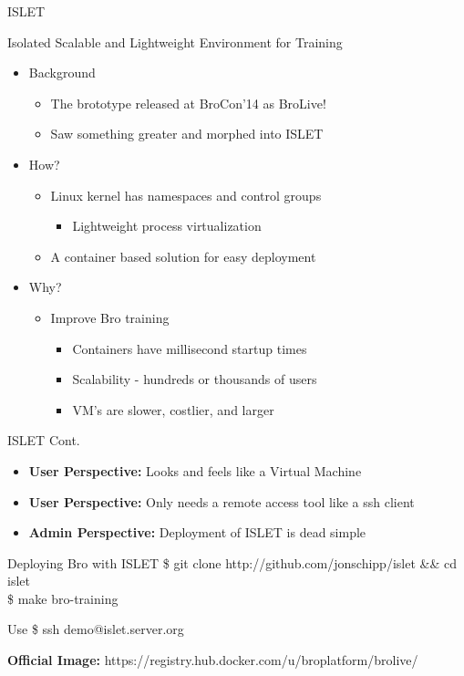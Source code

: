 \documentclass[xcolor=svgnames,handout]{beamer}
\begin{document}
\begin{frame}{ISLET}
  \begin{block}{Isolated Scalable and Lightweight Environment for Training}
    \begin{itemize}
      \item Background
    	\begin{itemize}
		\item The brototype released at BroCon'14 as BroLive!
                \item Saw something greater and morphed into ISLET
    	\end{itemize}
      \item How?
    	\begin{itemize}
		\item Linux kernel has namespaces and control groups
    	        \begin{itemize}
		  \item Lightweight process virtualization
    	        \end{itemize}
		\item A container based solution for easy deployment
    	\end{itemize}
      \item Why?
    	\begin{itemize}
		\item Improve Bro training
    	        \begin{itemize}
		  \item Containers have millisecond startup times
		  \item Scalability - hundreds or thousands of users
		  \item VM's are slower, costlier, and larger
    	        \end{itemize}
    	\end{itemize}
    \end{itemize}
  \end{block}
\end{frame}

\begin{frame}{ISLET Cont.}
  \begin{itemize}
    \item \textbf{User Perspective:} Looks and feels like a Virtual Machine
    \item \textbf{User Perspective:} Only needs a remote access tool like a ssh client
    \item \textbf{Admin Perspective:} Deployment of ISLET is dead simple
  \end{itemize}
    \begin{exampleblock}{Deploying Bro with ISLET}
	\alert{\$ git clone http://github.com/jonschipp/islet \&\& cd islet} \\
        \alert{\$ make bro-training}
    \end{exampleblock}
    \begin{exampleblock}{Use}
	\alert{\$ ssh demo@islet.server.org} \\
    \end{exampleblock}
    \item \textbf{Official Image:} https://registry.hub.docker.com/u/broplatform/brolive/
\end{frame}
\end{document}
